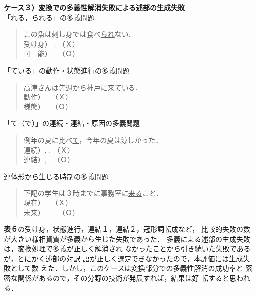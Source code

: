 \vspace{5mm}
\noindent
{\bf ケース３）変換での多義性解消失敗による述部の生成失敗}\\
\hspace*{4mm}「れる，られる」の多義問題
\begin{quote}
この魚は刺し身では食べ\underline{られ}ない．\\
受け身）
\underline{}. （Ｘ）\\
可　能）
\underline{}. （Ｏ）
\end{quote}
\hspace*{4mm}「ている」の動作・状態進行の多義問題
\begin{quote}
高津さんは先週から神戸に\underline{来ている}．\\
動作）
\underline{}. （Ｘ）\\
様態）
\underline{}. （Ｏ）
\end{quote}
\hspace*{4mm}「て（で）」の連続・連結・原因の多義問題
\begin{quote}
例年の夏に比べ\underline{て}，今年の夏は涼しかった．\\
連続）\underline{}, 
. （Ｘ）\\
連結）\underline{}, 
. （Ｏ）
\end{quote}
\hspace*{4mm}連体形から生じる時制の多義問題
\begin{quote}
下記の学生は３時までに事務室に\underline{来る}こと．\\
現在）\underline{}
. （Ｘ）\\
未来）\underline{}
. \ \ （Ｏ）
\end{quote}
\vspace{5mm}

{\bf 表６}の受け身，状態進行，連結１，連結２，冠形詞転成など，
比較的失敗の数が大きい様相資質が多義から生じた失敗であった．
多義による述部の生成失敗は，変換処理で多義が正しく解消され
なかったことから引き続いた失敗であるが，とにかく述部の対訳
語が正しく選定できなかったので，本評価には生成失敗として数
えた．しかし，このケースは変換部分での多義性解消の成功率と
緊密な関係があるので，その分野の技術が発展すれば，結果は好
転すると思われる．

